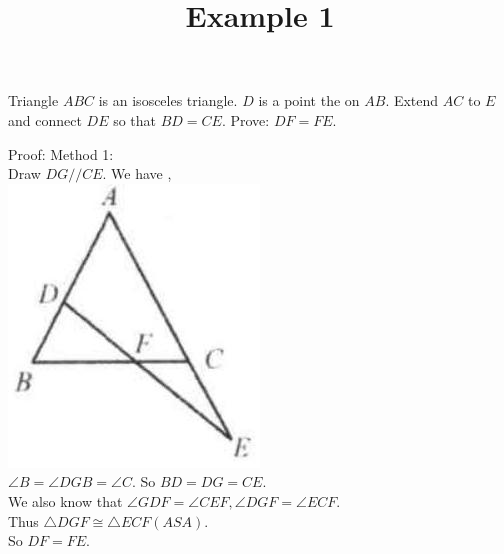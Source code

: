\documentclass{article}
\title{Example 1}
\date{}
\begin{document}
\maketitle

Triangle \(A B C\) is an isosceles triangle. \(D\) is a point the on \(A B\). Extend \(A C\) to \(E\) and connect \(D E\) so that \(B D=C E\). Prove: \(D F=F E\).

Proof:
Method 1:\\
Draw \(D G / / C E\). We have ,\\
\centering
\includegraphics[width=\textwidth]{images/102.jpg}\\
\(\angle B=\angle D G B=\angle C\). So \(B D=D G=C E\).\\
We also know that \(\angle G D F=\angle C E F, \angle D G F=\angle E C F\).\\
Thus \(\triangle D G F \cong \triangle E C F(A S A)\).\\
So \(D F=F E\).\\
\centering
\end{document}
